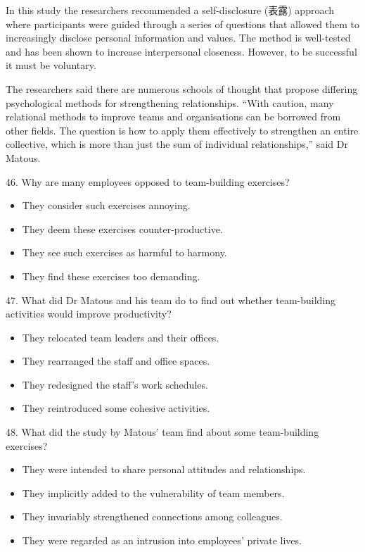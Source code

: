 \documentclass[UTF8,11pt]{ctexart}
\begin{document}
In this study the researchers recommended a self-disclosure (表露) approach where participants were guided through a series of questions that allowed them to increasingly disclose personal information and values. The method is well-tested and has been shown to increase interpersonal closeness. However, to be successful it must be voluntary.


The researchers said there are numerous schools of thought that propose differing psychological methods for strengthening relationships. “With caution, many relational methods to improve teams and organisations can be borrowed from other fields. The question is how to apply them effectively to strengthen an entire collective, which is more than just the sum of individual relationships,” said Dr Matous.


46. Why are many employees opposed to team-building exercises?


\begin{itemize}[leftmargin=2em,itemsep=.2em,topsep=.4em]\item[A.] They consider such exercises annoying.
\item[B.] They deem these exercises counter-productive.
\item[C.] They see such exercises as harmful to harmony.
\item[D.] They find these exercises too demanding.
\end{itemize}

47. What did Dr Matous and his team do to find out whether team-building activities would improve productivity?


\begin{itemize}[leftmargin=2em,itemsep=.2em,topsep=.4em]\item[A.] They relocated team leaders and their offices.
\item[B.] They rearranged the staff and office spaces.
\item[C.] They redesigned the staff’s work schedules.
\item[D.] They reintroduced some cohesive activities.
\end{itemize}

48. What did the study by Matous’ team find about some team-building exercises?


\begin{itemize}[leftmargin=2em,itemsep=.2em,topsep=.4em]\item[A.] They were intended to share personal attitudes and relationships.
\item[B.] They implicitly added to the vulnerability of team members.
\item[C.] They invariably strengthened connections among colleagues.
\item[D.] They were regarded as an intrusion into employees’ private lives.
\end{itemize}
\end{document}
